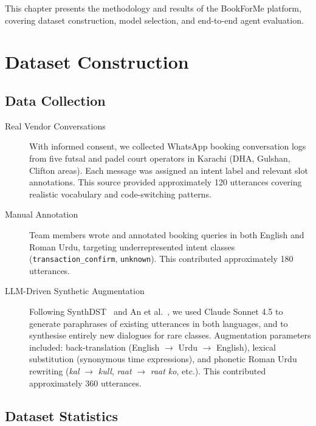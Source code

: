 This chapter presents the methodology and results of the BookForMe platform, covering dataset construction, model selection, and end-to-end agent evaluation.

\section{Dataset Construction}
\label{sec:results-dataset}

\subsection{Data Collection}

\begin{description}
  \item[Real Vendor Conversations]
        With informed consent, we collected WhatsApp booking conversation logs from
        five futsal and padel court operators in Karachi (DHA, Gulshan, Clifton areas).
        Each message was assigned an intent label and relevant slot annotations.
        This source provided approximately 120 utterances covering realistic
        vocabulary and code-switching patterns.

  \item[Manual Annotation]
        Team members wrote and annotated booking queries in both English and Roman Urdu,
        targeting underrepresented intent classes (\texttt{transaction\_confirm},
        \texttt{unknown}).  This contributed approximately 180 utterances.

  \item[LLM-Driven Synthetic Augmentation]
        Following SynthDST~\cite{he2024} and An et al.~\cite{an2022}, we used       Claude Sonnet 4.5 to generate paraphrases of existing utterances in both languages,
        and to synthesise entirely new dialogues for rare classes.  Augmentation
        parameters included: back-translation (English $\to$ Urdu $\to$ English),
        lexical substitution (synonymous time expressions), and phonetic Roman Urdu
        rewriting (\textit{kal} $\to$ \textit{kull}, \textit{raat} $\to$
        \textit{raat ko}, etc.).  This contributed approximately 360 utterances.
\end{description}

\subsection{Dataset Statistics}

